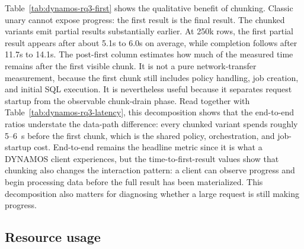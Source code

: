 Table~\ref{tab:dynamos-rq3-first} shows the qualitative benefit of chunking. Classic unary cannot expose progress: the first result is the final result. The chunked variants emit partial results substantially earlier. At 250k rows, the first partial result appears after about 5.1s to 6.0s on average, while completion follows after 11.7s to 14.1s. The post-first column estimates how much of the measured time remains after the first visible chunk. It is not a pure network-transfer measurement, because the first chunk still includes policy handling, job creation, and initial SQL execution. It is nevertheless useful because it separates request startup from the observable chunk-drain phase. Read together with Table~\ref{tab:dynamos-rq3-latency}, this decomposition shows that the end-to-end ratios understate the data-path difference: every chunked variant spends roughly 5--6~s before the first chunk, which is the shared policy, orchestration, and job-startup cost. End-to-end remains the headline metric since it is what a DYNAMOS client experiences, but the time-to-first-result values show that chunking also changes the interaction pattern: a client can observe progress and begin processing data before the full result has been materialized. This decomposition also matters for diagnosing whether a large request is still making progress.

\subsection{Resource usage}


